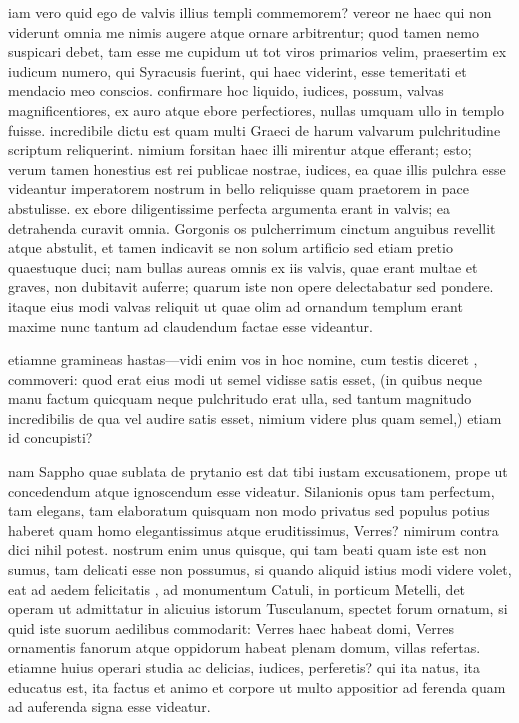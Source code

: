  iam vero quid ego de valvis illius templi commemorem? vereor ne haec qui non viderunt omnia me nimis augere atque ornare arbitrentur; quod tamen nemo suspicari debet, tam esse me cupidum ut tot viros primarios velim, praesertim ex iudicum numero, qui Syracusis fuerint, qui haec viderint, esse temeritati et mendacio meo conscios. confirmare hoc liquido, iudices, possum, valvas magnificentiores, ex auro atque ebore perfectiores, nullas umquam ullo in templo fuisse. incredibile dictu est quam multi Graeci de harum valvarum pulchritudine scriptum reliquerint. nimium forsitan haec illi mirentur atque efferant; esto; verum tamen honestius est rei publicae nostrae, iudices, ea quae illis pulchra esse videantur imperatorem nostrum in bello reliquisse quam praetorem in pace abstulisse. ex ebore diligentissime perfecta argumenta erant in valvis; ea detrahenda curavit omnia. Gorgonis os pulcherrimum cinctum anguibus revellit atque abstulit, et tamen indicavit se non solum artificio sed etiam pretio quaestuque duci; nam bullas aureas omnis ex iis valvis, quae erant multae et graves, non dubitavit auferre; quarum iste non opere delectabatur sed pondere. itaque eius modi valvas reliquit ut quae olim ad ornandum templum erant maxime nunc tantum ad claudendum factae esse videantur.

 etiamne gramineas hastas—vidi enim vos in hoc nomine, cum testis diceret , commoveri: quod erat eius modi ut semel vidisse satis esset, (in quibus neque manu factum quicquam neque pulchritudo erat ulla, sed tantum magnitudo incredibilis de qua vel audire satis esset, nimium videre plus quam semel,) etiam id concupisti?

 nam Sappho quae sublata de prytanio est dat tibi iustam excusationem, prope ut concedendum atque ignoscendum esse videatur. Silanionis opus tam perfectum, tam elegans, tam elaboratum quisquam non modo privatus sed populus potius haberet quam homo elegantissimus atque eruditissimus, Verres? nimirum contra dici nihil potest. nostrum enim unus quisque, qui tam beati quam iste est non sumus, tam delicati esse non possumus, si quando aliquid istius modi videre volet, eat ad aedem felicitatis , ad monumentum Catuli, in porticum Metelli, det operam ut admittatur in alicuius istorum Tusculanum, spectet forum ornatum, si quid iste suorum aedilibus commodarit: Verres haec habeat domi, Verres ornamentis fanorum atque oppidorum habeat plenam domum, villas refertas. etiamne huius operari studia ac delicias, iudices, perferetis? qui ita natus, ita educatus est, ita factus et animo et corpore ut multo appositior ad ferenda quam ad auferenda signa esse videatur.

